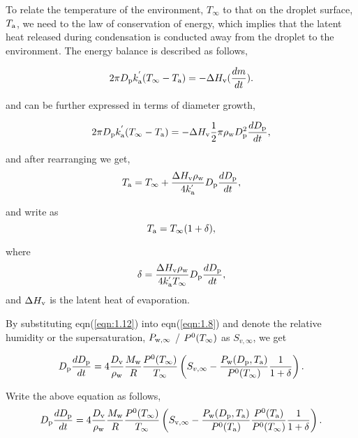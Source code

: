 \documentclass[12pt]{article}
\begin{document}
To relate the temperature of the environment, $T_{\infty}$ to that on the droplet surface, $T_{\rm a}$, we need to the law of conservation of energy, which implies that the latent heat released during condensation is conducted away from the droplet to the environment. The energy balance is described as follows, 

\begin{equation}\label{eqn:1.9}
2 \pi D_{\rm p} k^{'}_{\rm a} (T_{\infty}-T_{\rm a})= -\Delta H_{\rm v}(\frac{dm}{dt}).
\end{equation}

and can be further expressed in terms of diameter growth, 

\begin{equation}\label{eqn:1.10}
2 \pi D_{\rm p} k^{'}_{\rm a} (T_{\infty}-T_{\rm a})= -\Delta H_{\rm v} \frac{1}{2} \pi \rho_{\rm w} D_{\rm p}^{2} \frac{dD_{\rm p}}{dt},
\end{equation}

and after rearranging we get, 
\begin{equation}\label{eqn:1.11}
T_{\rm a}= T_{\infty} + \frac{\Delta H_{\rm v}  \rho_{\rm w}}{4 k^{'}_{\rm a}} D_{\rm p} \frac{dD_{\rm p}}{dt},
\end{equation}

and write as 
\begin{equation}\label{eqn:1.12}
T_{\rm a}=T_{\infty}(1+\delta),
\end{equation}

where 
\begin{equation}\label{eqn:1.13}
\delta= \frac{\Delta H_{\rm v}  \rho_{\rm w}}{4 k^{'}_{\rm a}T_{\infty}} D_{\rm p} \frac{dD_{\rm p}}{dt}, 
\end{equation}
and $\Delta H_{\rm v}$ is the latent heat of evaporation.


By substituting eqn(\ref{eqn:1.12}) into eqn(\ref{eqn:1.8}) and denote the relative humidity or the supersaturation, $P_{\rm w, \infty}$ / $P^{\rm 0}(T_{\infty})$ as $S_{v, \infty}$, we get 

\begin{equation}\label{eqn:1.14}
D_{\rm p}\frac{dD_{\rm p}}{dt}=4 \frac{D_{\rm v}} {\rho_{\rm w}} \frac{M_{\rm w}}{R} \frac{P^{\rm 0}(T_{\infty})} {T_{\infty}} \left(S_{v, \infty} - \frac{P_{\rm w}(D_{\rm p}, T_{\rm a})}{P^{\rm 0}(T_{\infty})} \frac{1}{1+\delta}\right).
\end{equation}


Write the above equation as follows,
\begin{equation}\label{eqn:1.15}
D_{\rm p}\frac{dD_{\rm p}}{dt}=4 \frac{D_{\rm v}} {\rho_{\rm w}} \frac{M_{\rm w}}{R} \frac{P^{\rm 0}(T_{\infty})} {T_{\infty}} \left(S_{\rm v, \infty} - \frac{P_{\rm w}(D_{\rm p}, T_{\rm a})}{P^{\rm 0}(T_{\rm a})} \frac{P^{\rm 0}(T_{\rm a})}{P^{\rm 0}(T_{\infty})}\frac{1}{1+\delta}\right).
\end{equation}
\end{document}

